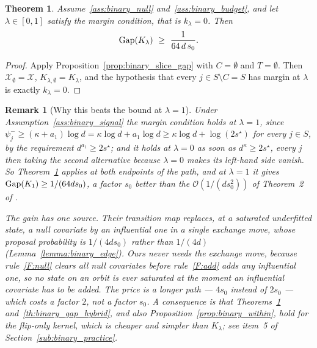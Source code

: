\documentclass[aos]{imsart}%
\newcommand{\ambientspace}[0]{\mathcal{X}}
\newcommand{\OO}{\mathcal{O}}  %
\theoremstyle{plain}
\newtheorem{theorem}{Theorem}[section]
\newtheorem{remark}{Remark}[section]
\theoremstyle{definition}
\begin{document}
    \begin{theorem}
        \label{th:binary_gap_margin}
        Assume~\ref{ass:binary_null} and~\ref{ass:binary_budget}, and let
        $\lambda\in[0,1]$ satisfy the margin condition, that is
        $k_\lambda=0$. Then
        \begin{equation}
            \label{eq:binary_gap_margin}
            \mathrm{Gap}(K_\lambda)\ \geq\ \frac{1}{64\,d\,s_0} .
        \end{equation}
    \end{theorem}

    \begin{proof}
        Apply Proposition~\ref{prop:binary_slice_gap} with $C=\emptyset$ and
        $T=\emptyset$. Then $\ambientspace_\emptyset=\ambientspace$,
        $K_{\lambda,\emptyset}=K_\lambda$, and the hypothesis that every
        $j\in S\setminus C=S$ has margin at $\lambda$ is exactly
        $k_\lambda=0$.
    \end{proof}

    \begin{remark}[Why this beats the bound at $\lambda=1$]
        \label{rem:binary_beats}
        Under Assumption~\ref{ass:binary_signal} the margin
        condition holds at $\lambda=1$, since
        $\psi_j^{-}\geq(\kappa+a_1)\log d=\kappa\log d+a_1\log d
        \geq\kappa\log d+\log(2s^{\star})$ for every $j\in S$, by the
        requirement $d^{a_1}\geq2s^{\star}$; and it holds at $\lambda=0$ as
        soon as $d^{\kappa}\geq2s^{\star}$, every $j$ then taking the second
        alternative because $\lambda=0$ makes its left-hand side vanish. So
        Theorem~\ref{th:binary_gap_margin} applies at both endpoints of the
        path, and at $\lambda=1$ it gives $\mathrm{Gap}(K_1)\geq1/(64ds_0)$, a factor
        $s_0$ \emph{better} than the $\OO(1/(ds_0^{2}))$ of Theorem~2 of
        \citet{YangWainwrightJordan2016}.

        The gain has one source. Their transition map replaces, at a saturated
        underfitted state, a null covariate by an influential one in a single
        exchange move, whose proposal probability is $1/(4ds_0)$ rather than
        $1/(4d)$ (Lemma~\ref{lemma:binary_edge}). Ours never needs the exchange
        move, because rule~\ref{F:null} clears \emph{all} null covariates
        before rule~\ref{F:add} adds any influential one, so no state on an
        orbit is ever saturated at the moment an influential covariate has to
        be added. The price is a longer path --- $4s_0$ instead of $2s_0$ ---
        which costs a factor $2$, not a factor $s_0$. A consequence is that
        Theorems~\ref{th:binary_gap_margin} and~\ref{th:binary_gap_hybrid}, and
        also Proposition~\ref{prop:binary_within}, hold for the flip-only
        kernel, which is cheaper and simpler than $K_\lambda$; see item~5 of
        Section~\ref{sub:binary_practice}.
    \end{remark}
\end{document}
